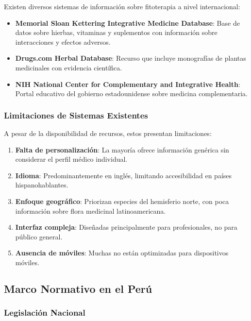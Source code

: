 \documentclass[12pt,a4paper]{article}
\begin{document}
Existen diversos sistemas de información sobre fitoterapia a nivel internacional:

\begin{itemize}
    \item \textbf{Memorial Sloan Kettering Integrative Medicine Database}: Base de datos sobre hierbas, vitaminas y suplementos con información sobre interacciones y efectos adversos.
    \item \textbf{Drugs.com Herbal Database}: Recurso que incluye monografías de plantas medicinales con evidencia científica.
    \item \textbf{NIH National Center for Complementary and Integrative Health}: Portal educativo del gobierno estadounidense sobre medicina complementaria.
\end{itemize}

\subsubsection{Limitaciones de Sistemas Existentes}

A pesar de la disponibilidad de recursos, estos presentan limitaciones:

\begin{enumerate}
    \item \textbf{Falta de personalización}: La mayoría ofrece información genérica sin considerar el perfil médico individual.
    \item \textbf{Idioma}: Predominantemente en inglés, limitando accesibilidad en países hispanohablantes.
    \item \textbf{Enfoque geográfico}: Priorizan especies del hemisferio norte, con poca información sobre flora medicinal latinoamericana.
    \item \textbf{Interfaz compleja}: Diseñadas principalmente para profesionales, no para público general.
    \item \textbf{Ausencia de móviles}: Muchas no están optimizadas para dispositivos móviles.
\end{enumerate}

\subsection{Marco Normativo en el Perú}

\subsubsection{Legislación Nacional}
\end{document}
